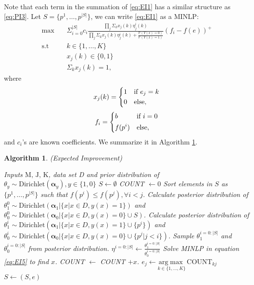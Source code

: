\documentclass[opre,nonblindrev]{informs3} %
\newcommand{\Prob}{\mathbb{P}}
\newtheorem{Algorithm}{Algorithm}
\begin{document}
Note that each term in the summation of \eqref{eq:EI1} has a similar structure as \eqref{eq:PI3}. Let $S=\{p^1,\ldots,p^{|S|}\}$, we can write \eqref{eq:EI1} as a MINLP:
\begin{equation} \label{eq:EI5}
\begin{split}
\max \quad &\Sigma_{i=0}^{|S|} c_i \frac{\prod_j \Sigma_k x_j(k) \eta_j^i(k)}{\prod_j \Sigma_k x_j(k) \eta_j^i(k) + \frac{\Prob(Y(x)=0)}{\Prob(Y(x)=1)}} (f_i-f(e))^+ \\
\text{s.t} \quad &k \in \{1,\ldots,K\} \\
&x_j(k) \in \{0,1\}\\
&\Sigma_k x_j(k)=1,
\end{split}
\end{equation}
where
\begin{equation*}
x_j(k)=\begin{dcases}
        1 & \text{if $e_j=k$}\\
        0 & \text{else},
\end{dcases}
\end{equation*}
\begin{equation*}
f_i=\begin{dcases}
        b & \text{if $i=0$}\\
        f(p^i)  & \text{else},
\end{dcases}
\end{equation*}
and $c_i$'s are known coefficients. We summarize it in Algorithm \ref{algo2}.

\begin{Algorithm}(Expected Improvement) \label{algo2}
\begin{algorithmic}[1]
\REQUIRE Inputs $\text{M, J, K}$, data set D and prior distribution of $\theta_y \sim \text{Dirichlet} (\boldsymbol \alpha_y), y \in \{1,0\}$
\STATE $S \leftarrow \emptyset $
\STATE COUNT $\leftarrow 0$
\STATE Sort elements in $S$ as $\{p^1,\ldots,p^{|S|}\}$ such that $f(p^i) \leq f(p^j), \forall i<j$.
\ENDIF
\STATE Calculate posterior distribution of $\theta_1^0 \sim \text{Dirichlet} (\boldsymbol \alpha_1|\{x|x \in D,y(x)=1\})$ and $\theta_0^0 \sim \text{Dirichlet} (\boldsymbol \alpha_0|\{x|x \in D,y(x)=0\} \cup S)$.
\STATE Calculate posterior distribution of $\theta_1^i \sim \text{Dirichlet} (\boldsymbol \alpha_1|\{x|x \in D,y(x)=1\} \cup \{p^i\})$ and $\theta_0^i \sim \text{Dirichlet} (\boldsymbol \alpha_0|\{x|x \in D,y(x)=0\} \cup \{p^j|j<i\})$.
\ENDFOR
\LOOP 
\STATE Sample $\theta_1^{i=0:|S|}$ and $\theta_0^{i=0:|S|}$ from posterior distribution.
\STATE $\eta^{i=0:|S|} \leftarrow \frac{\theta_1^{i=0:|S|}}{\theta_0^{i=0:|S|}}$
\STATE Solve MINLP in equation \eqref{eq:EI5} to find $x$.
\STATE COUNT $\leftarrow$ COUNT $+ x$.
\ENDLOOP
{}
\STATE $e_j \leftarrow \underset{k \in \{1,\ldots,K\}}{\mathrm{arg}\max} \, \text{COUNT}_{kj}$
\ENDFOR
\STATE $S \leftarrow (S, e)$
\ENDFOR
\end{algorithmic}
\end{Algorithm}
\end{document}
